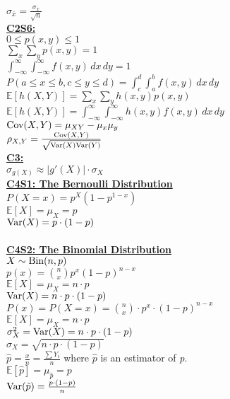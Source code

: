 \documentclass[letter, 12pt]{article}
\begin{document}
\begin{multicols}{2}
\(\sigma_{\bar{x}} = \frac{\sigma_x}{\sqrt{n}}\)\\
\textbf{\uline{C2S6:}}\\
\(0 \leq p(x,y) \leq 1\)\\
\(\sum_x \sum_y p(x,y) = 1\)\\
\(\int_{-\infty}^\infty \int_{-\infty}^\infty f(x,y)\,dx\,dy = 1\)\\
\(P(a \leq x \leq b, c \leq y \leq d) = \int_c^d \int_a^b f(x,y) \,dx\,dy\)\\
\(\mathds{E}[h(X,Y)] = \sum_x \sum_y h(x, y) p(x, y)\)\\
\(\mathds{E}[h(X,Y)] = \int_{-\infty}^\infty \int_{-\infty}^\infty h(x, y) f(x, y)\,dx\,dy\)\\
\(\textnormal{Cov}(X,Y) = \mu_{XY}-\mu_x\mu_y\)\\
\(\rho_{X,Y} = \frac{\textnormal{Cov}(X,Y)}{\sqrt{\textnormal{Var}(X)\textnormal{Var}(Y)}}\)\\
\textbf{\uline{C3:}}\\
\(\sigma_{g(X)} \approx \vert g'(X)\vert \cdot \sigma_X\)\\
\textbf{\uline{C4S1: The Bernoulli Distribution}}\\
\(P(X=x) = p^X(1-p^{1-x})\)\\
\(\mathds{E}[X] = \mu_X = p\)\\
\(\textnormal{Var}(X) = p\cdot(1-p)\)\\
\\
\textbf{\uline{C4S2: The Binomial Distribution}}\\
\(X \sim \textnormal{Bin}(n, p)\)\\
\(p(x) = {n \choose x} p^x(1-p)^{n-x}\)\\
\(\mathds{E}[X] = \mu_X = n\cdot p\)\\
\(\textnormal{Var}(X) = n\cdot p\cdot(1-p)\)\\
\(P(x) = P(X = x) = {n \choose x} \cdot p^x \cdot (1-p)^{n-x}\)\\
\(\mathds{E}[X] = \mu_X  = n\cdot p\)\\
\(\sigma^2_X = \textnormal{Var}(X) = n\cdot p \cdot (1-p)\)\\
\(\sigma_X = \sqrt{n\cdot p \cdot (1-p)}\)\\
\(\hat{p} = \frac{x}{n} = \frac{\sum Y_i}{n}\) where \(\hat{p}\) is an estimator of \textit{p}.\\
\(\mathds{E}[\hat{p}] = \mu_{\hat{p}}  = p\)\\
\(\textnormal{Var}(\hat{p}) = \frac{p\cdot (1-p)}{n}\)\\

\end{multicols}
\end{document}
